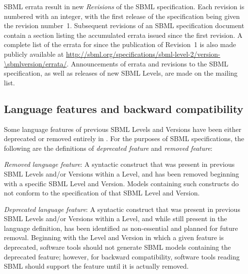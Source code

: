 SBML errata result in new \emph{Revisions} of the SBML
specification.  Each revision is numbered with an integer, with
the first release of the specification being given the revision
number~1.  Subsequent revisions of an SBML specification document
contain a section listing the accumulated errata issued since the
first revision.  A complete list of the errata for \changed{\sbmltwothree}
since the publication of Revision~1 is also made publicly
available at
\url{http://sbml.org/specifications/sbml-level-2/version-\sbmlversion/errata/}.
Announcements of errata and revisions to the SBML specification,
as well as releases of new SBML Levels, are made on the
 mailing
list.


\subsection{Language features and backward compatibility}
\label{sec:deprecated-features}

Some language features of previous SBML Levels and Versions have
been either deprecated or removed entirely in \changed{\sbmltwothree}.  For
the purposes of SBML specifications, the following are the
definitions of \emph{deprecated feature} and \emph{removed
  feature}:
\begin{description}
  
\item \emph{Removed language feature}: A syntactic construct that
  was present in previous SBML Levels and/or Versions within a
  Level, and has been removed beginning with a specific SBML Level
  and Version.  Models containing such constructs do not conform
  to the specification of that SBML Level and Version.
  
\item \emph{Deprecated language feature}: A syntactic construct
  that was present in previous SBML Levels and/or Versions within
  a Level, and while still present in the language definition, has
  been identified as non-essential and planned for future removal.
  Beginning with the Level and Version in which a given feature is
  deprecated, software tools should not generate SBML models
  containing the deprecated feature; however, for backward
  compatibility, software tools reading SBML should support the
  feature until it is actually removed.

\end{description}

